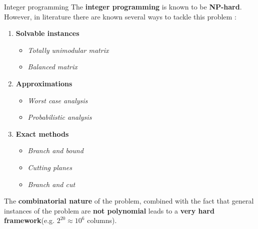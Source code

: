 \documentclass[aspectratio=169,xcolor=dvipsnames]{beamer}
\begin{document}
    \begin{frame}{Integer programming}
    The \textbf{integer programming} is known to be \textbf{NP-hard}. However, in literature there are known several ways to tackle this problem : 

    \begin{enumerate}
        \item \textbf{Solvable instances} 
            \begin{itemize}
            \item \textit{Totally unimodular matrix}
            \item \textit{Balanced matrix}
            \end{itemize}
        \item \textbf{Approximations}
         \begin{itemize}
            \item \textit{Worst case analysis}
            \item \textit{Probabilistic analysis}
            \end{itemize}
        \item \textbf{Exact methods}
         \begin{itemize}
            \item \textit{Branch and bound}
            \item \textit{Cutting planes}
            \item \textit{Branch and cut}
            \end{itemize}
    \end{enumerate}    
    The \textbf{combinatorial nature} of the problem, combined with the fact that general instances of the problem are \textbf{not polynomial} leads to a \textbf{very hard framework}(e.g. $2^{20} \approx 10^6$ columns).
    \end{frame}
    
\end{document}
